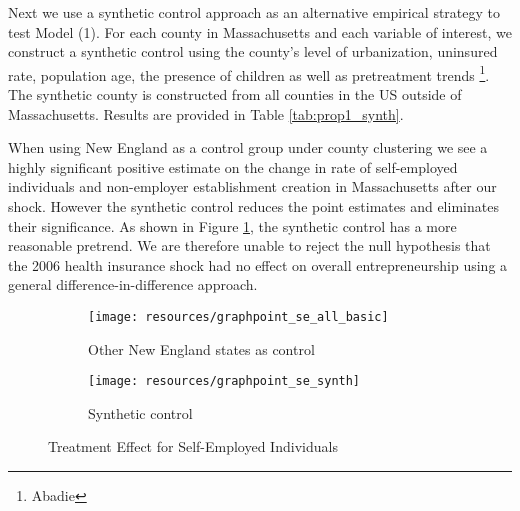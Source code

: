 \documentclass[12pt]{article}
\begin{document}
\begin{center}
	\begin{table}[H]
		\centering
		\caption{Model (1) estimator clustered by state} 
			
		\label{tab:prop1_state}
	\end{table}		
\end{center}

Next we use a synthetic control approach as an alternative empirical strategy to test Model (1). For each county in Massachusetts and each variable of interest, we construct a synthetic control using the county's level of urbanization, uninsured rate, population age, the presence of children as well as pretreatment trends \footnote{Abadie}. The synthetic county is constructed from all counties in the US outside of Massachusetts. Results are provided in Table \ref{tab:prop1_synth}.

\begin{center}
	\begin{table}[H]
		\centering
		\caption{Model (1) estimator with synthetic control} 
			
		\label{tab:prop1_synth}
	\end{table}		
\end{center}

When using New England as a control group under county clustering we see a highly significant positive estimate on the change in rate of self-employed individuals and non-employer establishment creation in Massachusetts after our shock. However the synthetic control reduces the point estimates and eliminates their significance. As shown in Figure \ref{fig:state_contrast}, the synthetic control has a more reasonable pretrend. We are therefore unable to reject the null hypothesis that the 2006 health insurance shock had no effect on overall entrepreneurship using a general difference-in-difference approach.

\begin{figure}[H]
	\centering
	\begin{subfigure}[b]{0.495\textwidth}
		\texttt{[image: resources/graphpoint\_se\_all\_basic]}
		\caption{Other New England states as control}
	\end{subfigure}
		\begin{subfigure}[b]{0.495\textwidth}
		\texttt{[image: resources/graphpoint\_se\_synth]}
		\caption{Synthetic control}
	\end{subfigure}
	\caption{Treatment Effect for Self-Employed Individuals}
	\label{fig:state_contrast}
\end{figure}
\end{document}
